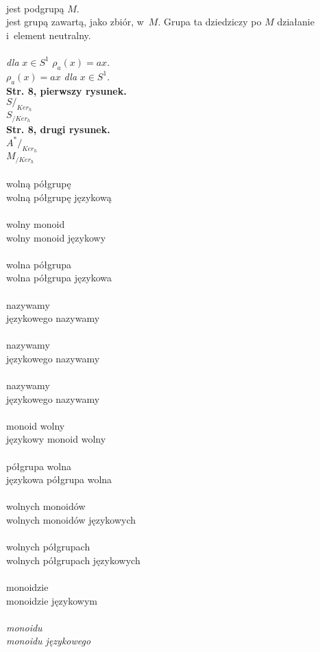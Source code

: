 \documentclass[a4paper,11pt]{article}
\begin{document}
\noindent
{} \\
\Jest  jest podgrupą $M$. \\
\Powin jest grupą zawartą, jako zbiór, w~$M$. Grupa ta dziedziczy po $M$
działanie i~element neutralny. \\
 \\
\Jest  \textit{dla} $x \in S^{ 1 }$ $\rho_{ a }( x )= a x$. \\
\Powin $\rho_{ a }( x ) = a x$ \textit{dla} $x \in S^{ 1 }$. \\
\textbf{Str. 8, pierwszy rysunek.} \\
\Jest  $S /_{ Ker_{ h } }$ \\
\Powin $S_{ / Ker_{ h } }$ \\
\textbf{Str. 8, drugi rysunek.} \\
\Jest  $A^{ * } /_{ Ker_{ h } }$ \\
\Powin $M_{ / Ker_{ h } }$ \\
 \\
\Jest  wolną półgrupę \\
\Powin wolną półgrupę językową \\
 \\
\Jest  wolny monoid \\
\Powin wolny monoid językowy \\
 \\
\Jest  wolna półgrupa \\
\Powin wolna półgrupa językowa \\
 \\
\Jest  nazywamy \\
\Powin językowego nazywamy \\
 \\
\Jest  nazywamy \\
\Powin językowego nazywamy \\
 \\
\Jest  nazywamy \\
\Powin językowego nazywamy \\
 \\
\Jest  monoid wolny \\
\Powin językowy monoid wolny \\
 \\
\Jest  półgrupa wolna \\
\Powin językowa półgrupa wolna \\
 \\
\Jest  wolnych monoidów \\
\Powin wolnych monoidów językowych \\
 \\
\Jest  wolnych półgrupach \\
\Powin wolnych półgrupach językowych \\
 \\
\Jest  monoidzie \\
\Powin monoidzie językowym \\
 \\
\Jest  \textit{monoidu} \\
\Powin \textit{monoidu językowego} \\
\end{document}
